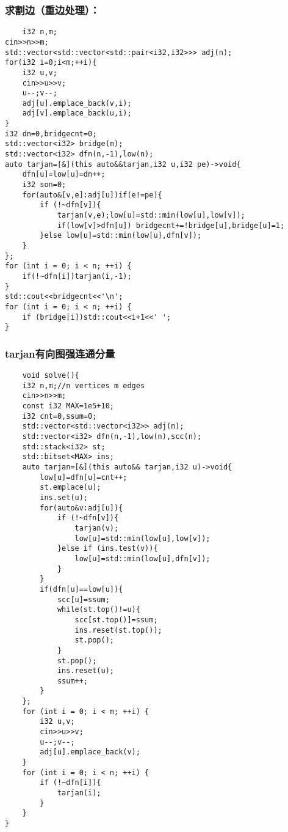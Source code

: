 \documentclass[UTF8]{ctexart}
\begin{document}
\subsubsection{求割边（重边处理）：}
\begin{lstlisting}
    i32 n,m;
cin>>n>>m;
std::vector<std::vector<std::pair<i32,i32>>> adj(n);
for(i32 i=0;i<m;++i){
    i32 u,v;
    cin>>u>>v;
    u--;v--;
    adj[u].emplace_back(v,i);
    adj[v].emplace_back(u,i);
}
i32 dn=0,bridgecnt=0;
std::vector<i32> bridge(m);
std::vector<i32> dfn(n,-1),low(n);
auto tarjan=[&](this auto&&tarjan,i32 u,i32 pe)->void{
    dfn[u]=low[u]=dn++;
    i32 son=0;
    for(auto&[v,e]:adj[u])if(e!=pe){
        if (!~dfn[v]){
            tarjan(v,e);low[u]=std::min(low[u],low[v]);
            if(low[v]>dfn[u]) bridgecnt+=!bridge[u],bridge[u]=1;
        }else low[u]=std::min(low[u],dfn[v]);
    }
};
for (int i = 0; i < n; ++i) {
    if(!~dfn[i])tarjan(i,-1);
}
std::cout<<bridgecnt<<'\n';
for (int i = 0; i < n; ++i) {
    if (bridge[i])std::cout<<i+1<<' ';
} 
\end{lstlisting}
\subsubsection{tarjan有向图强连通分量}
\begin{lstlisting}
    void solve(){
    i32 n,m;//n vertices m edges
    cin>>n>>m;
    const i32 MAX=1e5+10;
    i32 cnt=0,ssum=0;
    std::vector<std::vector<i32>> adj(n);
    std::vector<i32> dfn(n,-1),low(n),scc(n);
    std::stack<i32> st;
    std::bitset<MAX> ins;
    auto tarjan=[&](this auto&& tarjan,i32 u)->void{
        low[u]=dfn[u]=cnt++;
        st.emplace(u);
        ins.set(u);
        for(auto&v:adj[u]){
            if (!~dfn[v]){
                tarjan(v);
                low[u]=std::min(low[u],low[v]);
            }else if (ins.test(v)){
                low[u]=std::min(low[u],dfn[v]);
            }
        }
        if(dfn[u]==low[u]){
            scc[u]=ssum;
            while(st.top()!=u){
                scc[st.top()]=ssum;
                ins.reset(st.top());
                st.pop();
            }
            st.pop();
            ins.reset(u);
            ssum++;
        }
    };
    for (int i = 0; i < m; ++i) {
        i32 u,v;
        cin>>u>>v;
        u--;v--;
        adj[u].emplace_back(v);
    }
    for (int i = 0; i < n; ++i) {
        if (!~dfn[i]){
            tarjan(i);
        }
    }
}
\end{lstlisting}
\end{document}
